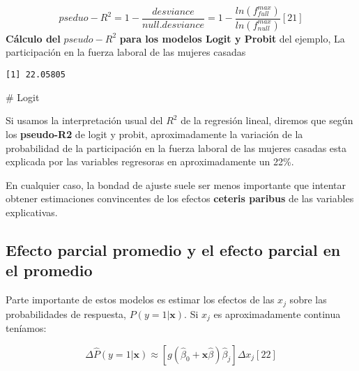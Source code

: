\documentclass[
  letterpaper,
  DIV=11,
  numbers=noendperiod]{scrreprt}
\newenvironment{Shaded}{\begin{snugshade}}{\end{snugshade}}
\newcommand{\CommentTok}[1]{\textcolor[rgb]{0.37,0.37,0.37}{#1}}
\newcommand{\DecValTok}[1]{\textcolor[rgb]{0.68,0.00,0.00}{#1}}
\newcommand{\NormalTok}[1]{\textcolor[rgb]{0.00,0.23,0.31}{#1}}
\newcommand{\OtherTok}[1]{\textcolor[rgb]{0.00,0.23,0.31}{#1}}
\newcommand{\SpecialCharTok}[1]{\textcolor[rgb]{0.37,0.37,0.37}{#1}}
\begin{document}
\[pseduo-R^2=1-\frac{desviance}{null.desviance}=1-\frac{ln(f^{max}_{full})}{ln(f^{max}_{null})} [21]\]
\textbf{Cálculo del} \(pseudo-R^2\) \textbf{para los modelos Logit y
Probit} del ejemplo, La participación en la fuerza laboral de las
mujeres casadas

\begin{Shaded}
\end{Shaded}

\begin{verbatim}
[1] 22.05805
\end{verbatim}

\begin{Shaded}
\begin{Highlighting}[]
\CommentTok{\# Logit}
\end{Highlighting}
\end{Shaded}

Si usamos la interpretación usual del \(R^2\) de la regresión lineal,
diremos que según los \textbf{pseudo-R2} de logit y probit,
aproximadamente la variación de la probabilidad de la participación en
la fuerza laboral de las mujeres casadas esta explicada por las
variables regresoras en aproximadamente un 22\%.

En cualquier caso, la bondad de ajuste suele ser menos importante que
intentar obtener estimaciones convincentes de los efectos
\textbf{ceteris paribus} de las variables explicativas.

\subsection{Efecto parcial promedio y el efecto parcial en el
promedio}\label{efecto-parcial-promedio-y-el-efecto-parcial-en-el-promedio}

Parte importante de estos modelos es estimar los efectos de las \(x_j\)
sobre las probabilidades de respuesta, \(P(y=1|\mathbf{x})\). Si \(x_j\)
es aproximadamente continua teníamos:

\[\Delta \hat{P}(y=1|\mathbf{x})\approx[g(\hat{\beta}_0+\mathbf{x}\hat{\beta})\hat{\beta}_j]\Delta x_j [22]\]
\end{document}
